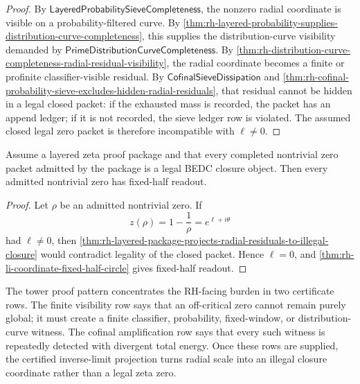 \begin{proof}
By $\mathsf{LayeredProbabilitySieveCompleteness}$, the nonzero radial
coordinate is visible on a probability-filtered curve.  By
\autoref{thm:rh-layered-probability-supplies-distribution-curve-completeness},
this supplies the distribution-curve visibility demanded by
$\mathsf{PrimeDistributionCurveCompleteness}$.  By
\autoref{thm:rh-distribution-curve-completeness-radial-residual-visibility},
the radial coordinate becomes a finite or profinite classifier-visible
residual.  By $\mathsf{CofinalSieveDissipation}$ and
\autoref{thm:rh-cofinal-probability-sieve-excludes-hidden-radial-residuals},
that residual cannot be hidden in a legal closed packet: if the
exhausted mass is recorded, the packet has an append ledger; if it is
not recorded, the sieve ledger row is violated.  The assumed closed
legal zero packet is therefore incompatible with $\ell\ne0$.
\end{proof}

\begin{theorem}
\label{thm:rh-probability-sieve-tower-route-conditional-fixed-half}
Assume a layered zeta proof package and that every completed
nontrivial zero packet admitted by the package is a legal BEDC closure
object.  Then every admitted nontrivial zero has fixed-half readout.
\end{theorem}

\begin{proof}
Let $\rho$ be an admitted nontrivial zero.  If
$$
z(\rho)=1-\frac1\rho=e^{\ell+i\theta}
$$
had $\ell\ne0$, then
\autoref{thm:rh-layered-package-projects-radial-residuals-to-illegal-closure}
would contradict legality of the closed packet.  Hence $\ell=0$, and
\autoref{thm:rh-li-coordinate-fixed-half-circle} gives fixed-half
readout.
\end{proof}

\begin{principle}
\label{prin:rh-probability-sieve-tower-proof-pattern-audit-boundary}
The tower proof pattern concentrates the RH-facing burden in two
certificate rows.  The finite visibility row says that an off-critical
zero cannot remain purely global; it must create a finite classifier,
probability, fixed-window, or distribution-curve witness.  The cofinal
amplification row says that every such witness is repeatedly detected
with divergent total energy.  Once these rows are supplied, the
certified inverse-limit projection turns radial scale into an illegal
closure coordinate rather than a legal zeta zero.
\end{principle}
